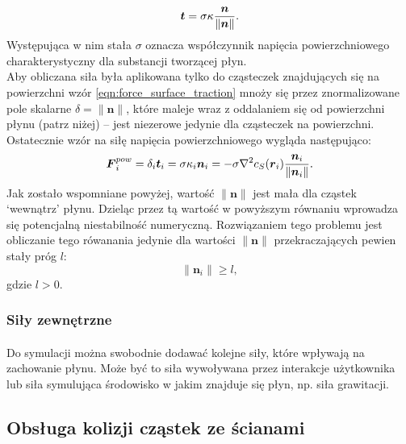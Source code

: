 \begin{equation}
\boldsymbol{t} = \sigma \kappa {\boldsymbol{n} \over \|\boldsymbol{n}\|}.
\label{eqn:force_surface_traction}
\end{equation}
Występująca w nim stała $\sigma$ oznacza współczynnik napięcia powierzchniowego charakterystyczny dla substancji tworzącej płyn.\\
Aby obliczana siła była aplikowana tylko do cząsteczek znajdujących się na powierzchni wzór \eqref{eqn:force_surface_traction} mnoży się przez znormalizowane pole skalarne $\delta = \|\boldsymbol{n}\|$, które maleje wraz z oddalaniem się od powierzchni płynu (patrz niżej) -- jest niezerowe jedynie dla cząsteczek na powierzchni. Ostatecznie wzór na siłę napięcia powierzchniowego wygląda następująco:
\begin{equation}
\boldsymbol{F}_i^{pow} = \delta_i \boldsymbol{t}_i = \sigma \kappa_i \boldsymbol{n}_i = - \sigma \nabla^2{c}_S(\boldsymbol{r}_i) {\boldsymbol{n}_i \over \|\boldsymbol{n}_i\|}.
\label{eqn:sph_force_surface_tension}
\end{equation}
Jak zostało wspomniane powyżej, wartość $\|\boldsymbol{n}\|$ jest mała dla cząstek `wewnątrz' płynu. Dzieląc przez tą wartość w powyższym równaniu wprowadza się potencjalną niestabilność numeryczną. Rozwiązaniem tego problemu jest obliczanie tego rówanania jedynie dla wartości $\|\boldsymbol{n}\|$ przekraczających pewien stały próg $l$:
\begin{equation}
\|\boldsymbol{n}_i\| \geq l,
\label{eqn:sph_force_surface_tension_threshold}
\end{equation}
gdzie $l > 0$.\\
\par

\subsubsection{Siły zewnętrzne}

\paragraph{}
Do symulacji można swobodnie dodawać kolejne siły, które wpływają na zachowanie płynu. Może być to siła wywoływana przez interakcje użytkownika lub siła symulująca środowisko w jakim znajduje się płyn, np. siła grawitacji.
\par


\subsection{Obsługa kolizji cząstek ze ścianami}

